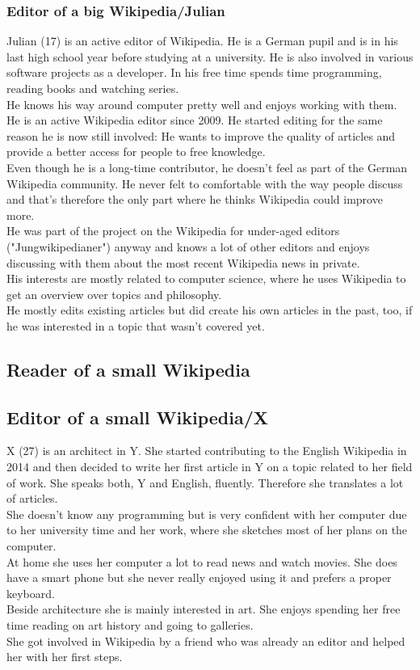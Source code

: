 \documentclass[11pt]{article}
\begin{document}
  \subsubsection{Editor of a big Wikipedia/Julian}
  Julian (17) is an active editor of Wikipedia. He is a German pupil and is in his last high school year before studying at a university. He is also involved in various software projects as a developer. In his free time spends time programming, reading books and watching series. \\
  He knows his way around computer pretty well and enjoys working with them. \\
  He is an active Wikipedia editor since 2009. He started editing for the same reason he is now still involved: He wants to improve the quality of articles and provide a better access for people to free knowledge. \\
  Even though he is a long-time contributor, he doesn't feel as part of the German Wikipedia community. He never felt to comfortable with the way people discuss and that's therefore the only part where he thinks Wikipedia could improve more. \\
  He was part of the project on the Wikipedia for under-aged editors ("Jungwikipedianer") anyway and knows a lot of other editors and enjoys discussing with them about the most recent Wikipedia news in private. \\
  His interests are mostly related to computer science, where he uses Wikipedia to get an overview over topics and philosophy. \\
  He mostly edits existing articles but did create his own articles in the past, too, if he was interested in a topic that wasn't covered yet.  



  \subsection{Reader of a small Wikipedia}

  \subsection{Editor of a small Wikipedia/X}
  X (27) is an architect in Y. She started contributing to the English Wikipedia in 2014 and then decided to write her first article in Y on a topic related to her field of work. She speaks both, Y and English, fluently. Therefore she translates a lot of articles. \\
  She doesn't know any programming but is very confident with her computer due to her university time and her work, where she sketches most of her plans on the computer. \\
  At home she uses her computer a lot to read news and watch movies. She does have a smart phone but she never really enjoyed using it and prefers a proper keyboard. \\  
  Beside architecture she is mainly interested in art. She enjoys spending her free time reading on art history and going to galleries. \\
  She got involved in Wikipedia by a friend who was already an editor and helped her with her first steps.
\end{document}
